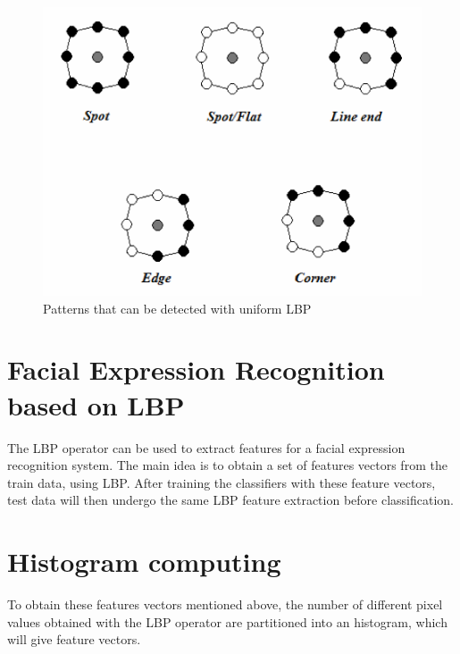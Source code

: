 \begin{figure}[!h]
\begin{center}
\noindent \includegraphics[scale=0.7]{figures/lbp_structural_features} 
\newline
\caption{Patterns that can be detected with uniform LBP}
\label{lbp_structural_features}
\end{center} 
\end{figure}

\section{Facial Expression Recognition based on LBP}

\vspace{\baselineskip}
\noindent The LBP operator can be used to extract features for a facial expression recognition system. The main idea is to obtain a set of features vectors from the train data, using LBP. After training the classifiers with these feature vectors, test data will then undergo the same LBP feature extraction before classification. 
\newline

\section{Histogram computing}

\vspace{\baselineskip}
\noindent To obtain these features vectors mentioned above, the number of different pixel values obtained with the LBP operator are partitioned into an histogram, which will give feature vectors.
\newline


